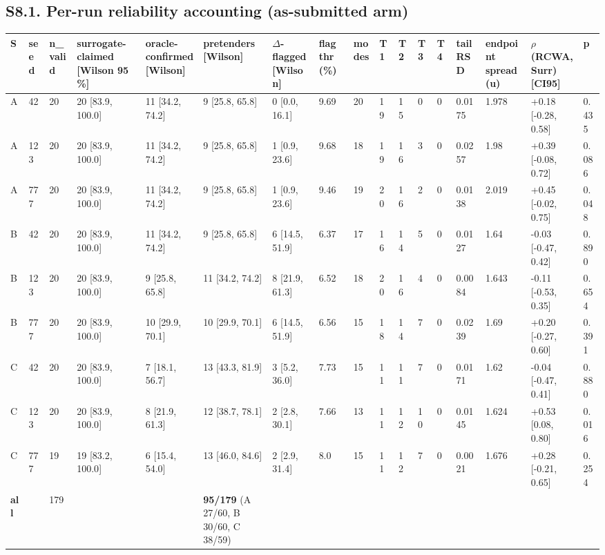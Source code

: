 \documentclass[11pt,a4paper]{article}
\newcounter{none}   %
\begin{document}
\begin{landscape}
\subsection*{S8.1. Per-run reliability accounting (as-submitted arm)}

\begingroup
\setlength{\tabcolsep}{2pt}\tiny
{}
\label{stab:8}
{\def\LTcaptype{none} %
\begin{longtable}[]{@{}lllllllllllllllll@{}}
\toprule\noalign{}
S & seed & n\_valid & surrogate-claimed {[}Wilson 95 \%{]} & oracle-confirmed {[}Wilson{]} & pretenders {[}Wilson{]} & \ensuremath{\Delta}-flagged {[}Wilson{]} & flag thr (\%) & modes & T1 & T2 & T3 & T4 & tail RSD & endpoint spread (u) & \ensuremath{\rho}(RCWA, Surr) {[}CI95{]} & p \\
\midrule\noalign{}
\endhead
\bottomrule\noalign{}
\endlastfoot
A & 42 & 20 & 20 {[}83.9, 100.0{]} & 11 {[}34.2, 74.2{]} & 9 {[}25.8, 65.8{]} & 0 {[}0.0, 16.1{]} & 9.69 & 20 & 19 & 15 & 0 & 0 & 0.0175 & 1.978 & +0.18 {[}-0.28, 0.58{]} & 0.435 \\
A & 123 & 20 & 20 {[}83.9, 100.0{]} & 11 {[}34.2, 74.2{]} & 9 {[}25.8, 65.8{]} & 1 {[}0.9, 23.6{]} & 9.68 & 18 & 19 & 16 & 3 & 0 & 0.0257 & 1.98 & +0.39 {[}-0.08, 0.72{]} & 0.086 \\
A & 777 & 20 & 20 {[}83.9, 100.0{]} & 11 {[}34.2, 74.2{]} & 9 {[}25.8, 65.8{]} & 1 {[}0.9, 23.6{]} & 9.46 & 19 & 20 & 16 & 2 & 0 & 0.0138 & 2.019 & +0.45 {[}-0.02, 0.75{]} & 0.048 \\
B & 42 & 20 & 20 {[}83.9, 100.0{]} & 11 {[}34.2, 74.2{]} & 9 {[}25.8, 65.8{]} & 6 {[}14.5, 51.9{]} & 6.37 & 17 & 16 & 14 & 5 & 0 & 0.0127 & 1.64 & -0.03 {[}-0.47, 0.42{]} & 0.890 \\
B & 123 & 20 & 20 {[}83.9, 100.0{]} & 9 {[}25.8, 65.8{]} & 11 {[}34.2, 74.2{]} & 8 {[}21.9, 61.3{]} & 6.52 & 18 & 20 & 16 & 4 & 0 & 0.0084 & 1.643 & -0.11 {[}-0.53, 0.35{]} & 0.654 \\
B & 777 & 20 & 20 {[}83.9, 100.0{]} & 10 {[}29.9, 70.1{]} & 10 {[}29.9, 70.1{]} & 6 {[}14.5, 51.9{]} & 6.56 & 15 & 18 & 14 & 7 & 0 & 0.0239 & 1.69 & +0.20 {[}-0.27, 0.60{]} & 0.391 \\
C & 42 & 20 & 20 {[}83.9, 100.0{]} & 7 {[}18.1, 56.7{]} & 13 {[}43.3, 81.9{]} & 3 {[}5.2, 36.0{]} & 7.73 & 15 & 11 & 11 & 7 & 0 & 0.0171 & 1.62 & -0.04 {[}-0.47, 0.41{]} & 0.880 \\
C & 123 & 20 & 20 {[}83.9, 100.0{]} & 8 {[}21.9, 61.3{]} & 12 {[}38.7, 78.1{]} & 2 {[}2.8, 30.1{]} & 7.66 & 13 & 11 & 12 & 10 & 0 & 0.0145 & 1.624 & +0.53 {[}0.08, 0.80{]} & 0.016 \\
C & 777 & 19 & 19 {[}83.2, 100.0{]} & 6 {[}15.4, 54.0{]} & 13 {[}46.0, 84.6{]} & 2 {[}2.9, 31.4{]} & 8.0 & 15 & 11 & 12 & 7 & 0 & 0.0021 & 1.676 & +0.28 {[}-0.21, 0.65{]} & 0.254 \\
\textbf{all} & & 179 & & & \textbf{95/179} (A 27/60, B 30/60, C 38/59) & & & & & & & & & & & \\
\end{longtable}
}
\endgroup
\end{landscape}
\end{document}
